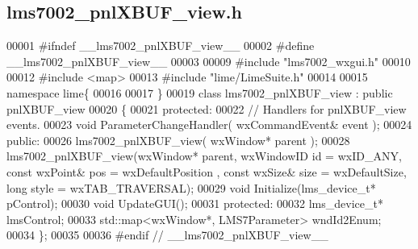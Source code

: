 \subsection{lms7002\+\_\+pnl\+X\+B\+U\+F\+\_\+view.\+h}
\label{lms7002__pnlXBUF__view_8h_source}

\begin{DoxyCode}
00001 \textcolor{preprocessor}{#ifndef \_\_lms7002\_pnlXBUF\_view\_\_}
00002 \textcolor{preprocessor}{#define \_\_lms7002\_pnlXBUF\_view\_\_}
00003 
00009 \textcolor{preprocessor}{#include "lms7002_wxgui.h"}
00010 
00012 \textcolor{preprocessor}{#include <map>}
00013 \textcolor{preprocessor}{#include "lime/LimeSuite.h"}
00014 
00015 \textcolor{keyword}{namespace }lime\{
00016     
00017 \}
00019 \textcolor{keyword}{class }lms7002_pnlXBUF_view : \textcolor{keyword}{public} pnlXBUF_view
00020 \{
00021     \textcolor{keyword}{protected}:
00022         \textcolor{comment}{// Handlers for pnlXBUF\_view events.}
00023         \textcolor{keywordtype}{void} ParameterChangeHandler( wxCommandEvent& event );
00024     \textcolor{keyword}{public}:
00026         lms7002_pnlXBUF_view( wxWindow* parent );
00028     lms7002_pnlXBUF_view(wxWindow* parent, wxWindowID \textcolor{keywordtype}{id} = wxID\_ANY, \textcolor{keyword}{const} wxPoint& pos = wxDefaultPosition
      , \textcolor{keyword}{const} wxSize& size = wxDefaultSize, \textcolor{keywordtype}{long} style = wxTAB\_TRAVERSAL);
00029     \textcolor{keywordtype}{void} Initialize(lms_device_t* pControl);
00030     \textcolor{keywordtype}{void} UpdateGUI();
00031 \textcolor{keyword}{protected}:
00032     lms_device_t* lmsControl;
00033     std::map<wxWindow*, LMS7Parameter> wndId2Enum;
00034 \};
00035 
00036 \textcolor{preprocessor}{#endif // \_\_lms7002\_pnlXBUF\_view\_\_}
\end{DoxyCode}
